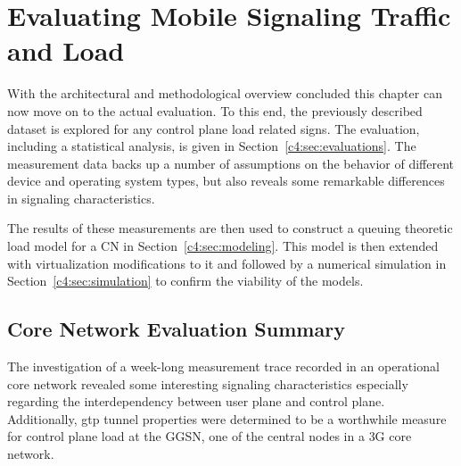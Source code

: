 \chapter{Evaluating Mobile Signaling Traffic and Load}
\label{chap:mobilenetsmeasuring}

With the architectural and methodological overview concluded this chapter can now move on to the actual evaluation. To this end, the previously described dataset is explored for any control plane load related signs. The evaluation, including a statistical analysis, is given in Section~\ref{c4:sec:evaluations}. The measurement data backs up a number of assumptions on the behavior of different device and operating system types, but also reveals some remarkable differences 
in signaling characteristics.

The results of these measurements are then used to construct a queuing theoretic load model for a \gls{CN} in Section~\ref{c4:sec:modeling}. This model is then extended with  virtualization modifications to it and followed by a numerical simulation in Section~\ref{c4:sec:simulation} to confirm the viability of the models.











\section{Core Network Evaluation Summary}
\label{c4:sec:conclusion}


The investigation of a week-long measurement trace recorded in an operational core network revealed some interesting signaling characteristics especially regarding the interdependency between user plane and control plane. Additionally, \gls{gtp} tunnel properties were determined to be a worthwhile measure for control plane load at the \gls{GGSN}, one of the central nodes in a \gls{3G} core network.


